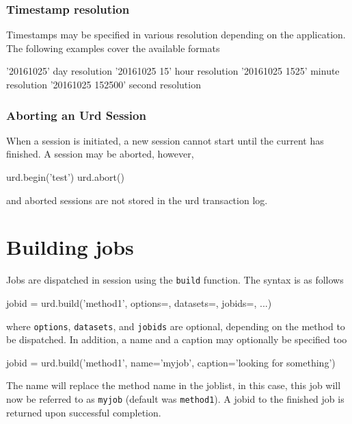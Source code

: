 \subsubsection{Timestamp resolution}

Timestamps may be specified in various resolution depending on the
application.  The following examples cover the available formats\\
\begin{python}
   '20161025'              day resolution
   '20161025 15'           hour resolution
   '20161025 1525'         minute resolution
   '20161025 152500'       second resolution
\end{python}



\subsubsection{Aborting an Urd Session}

When a session is initiated, a new session cannot start until the
current has finished.  A session may be aborted, however,\\
\begin{python}
  urd.begin('test')
  urd.abort()
\end{python}
and aborted sessions are not stored in the urd transaction log.



\newpage
\section{Building jobs}

Jobs are dispatched in session using the \texttt{build} function.  The
syntax is as follows\\
\begin{python}
  jobid = urd.build('method1', options={}, datasets={}, jobids={}, ...)
\end{python}
where \texttt{options}, \texttt{datasets}, and \texttt{jobids} are
optional, depending on the method to be dispatched.  In addition, a
name and a caption may optionally be specified too\\
\begin{python}
  jobid = urd.build('method1', name='myjob', caption='looking for something')
\end{python}
The name will replace the method name in the joblist, in this case,
this job will now be referred to as \texttt{myjob} (default was
\texttt{method1}).  A jobid to the finished job is returned upon
successful completion.





